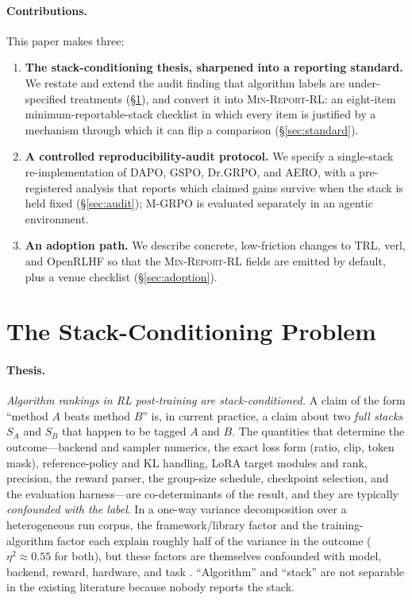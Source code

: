 \documentclass[11pt]{article}
\newcommand{\minreport}{\textsc{Min-Report-RL}}
\begin{document}
\paragraph{Contributions.}
This paper makes three:
\begin{enumerate}[leftmargin=1.6em, itemsep=2pt]
  \item \textbf{The stack-conditioning thesis, sharpened into a reporting
        standard.} We restate and extend the audit finding that algorithm
        labels are under-specified treatments (\S\ref{sec:stack}), and convert
        it into \minreport{}: an eight-item minimum-reportable-stack checklist
        in which every item is justified by a mechanism through which it can
        flip a comparison (\S\ref{sec:standard}).
  \item \textbf{A controlled reproducibility-audit protocol.} We specify a
        single-stack re-implementation of DAPO, GSPO, Dr.GRPO, and AERO,
        with a pre-registered analysis that reports which claimed gains survive
        when the stack is held fixed (\S\ref{sec:audit}); M-GRPO is evaluated
        separately in an agentic environment.
  \item \textbf{An adoption path.} We describe concrete, low-friction changes
        to TRL, verl, and OpenRLHF so that the \minreport{} fields are emitted
        by default, plus a venue checklist (\S\ref{sec:adoption}).
\end{enumerate}

\section{The Stack-Conditioning Problem}
\label{sec:stack}

\paragraph{Thesis.}
\emph{Algorithm rankings in RL post-training are stack-conditioned.} A claim of
the form ``method $A$ beats method $B$'' is, in current practice, a claim about
two \emph{full stacks} $S_A$ and $S_B$ that happen to be tagged $A$ and $B$. The
quantities that determine the outcome---backend and sampler numerics, the exact
loss form (ratio, clip, token mask), reference-policy and KL handling, LoRA
target modules and rank, precision, the reward parser, the group-size schedule,
checkpoint selection, and the evaluation harness---are co-determinants of the
result, and they are typically \emph{confounded with the label}. In a one-way
variance decomposition over a heterogeneous run corpus, the framework/library
factor and the training-algorithm factor each explain roughly half of the
variance in the outcome ($\eta^2 \approx 0.55$ for both), but these factors are
themselves confounded with model, backend, reward, hardware, and task
\cite{zvfaudit2026}. ``Algorithm'' and ``stack'' are not separable in the
existing literature because nobody reports the stack.
\end{document}
